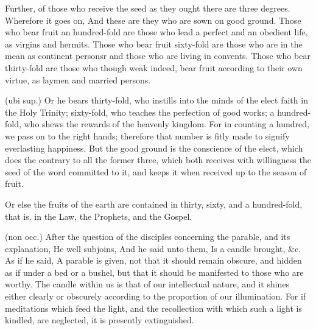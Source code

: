  Further, of those who receive the seed as they ought there are three degrees. Wherefore it goes on, And these are they who are sown on good ground. Those who bear fruit an hundred-fold are those who lead a perfect and an obedient life, as virgins and hermits. Those who bear fruit sixty-fold are those who are in the mean as continent personsr and those who are living in convents. Those who bear thirty-fold are those who though weak indeed, bear fruit according to their own virtue, as laymen and married persons.

 (ubi sup.) Or he bears thirty-fold, who instills into the minds of the elect faith in the Holy Trinity; sixty-fold, who teaches the perfection of good works; a hundred-fold, who shews the rewards of the heavenly kingdom. For in counting a hundred, we pass on to the right hands; therefore that number is fitly made to signify everlasting happiness. But the good ground is the conscience of the elect, which does the contrary to all the former three, which both receives with willingness the seed of the word committed to it, and keeps it when received up to the season of fruit.

 Or else the fruits of the earth are contained in thirty, sixty, and a hundred-fold, that is, in the Law, the Prophets, and the Gospel.

 

 (non occ.) After the question of the disciples concerning the parable, and its explanation, He well subjoins, And he said unto them, Is a candle brought, \&c. As if he said, A parable is given, not that it should remain obscure, and hidden as if under a bed or a bushel, but that it should be manifested to those who are worthy. The candle within us is that of our intellectual nature, and it shines either clearly or obscurely according to the proportion of our illumination. For if meditations which feed the light, and the recollection with which such a light is kindled, are neglected, it is presently extinguished.

